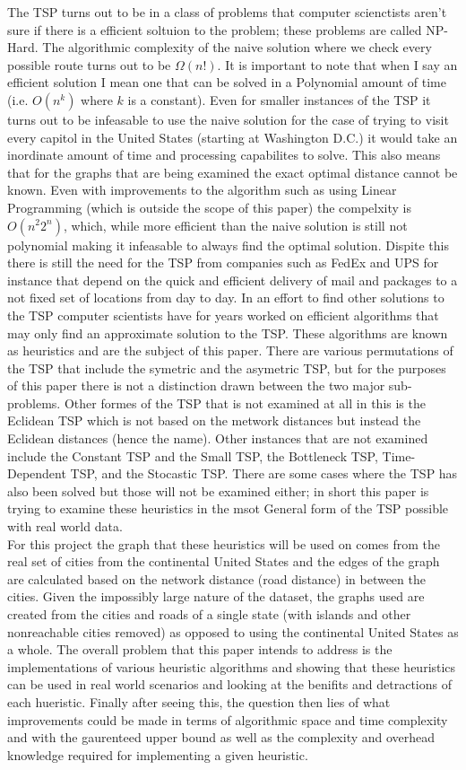 \documentclass[midd]{thesis}
\newcommand{\tab}{\hspace*{2em}}
\begin{document}
\tab The TSP turns out to be in a class of problems that computer scienctists aren't sure if there is a efficient soltuion to the problem; these problems are called NP-Hard. The algorithmic complexity of the naive solution where we check every possible route turns out to be $\Omega(n!)$. It is important to note that when I say an efficient solution I mean one that can be solved in a Polynomial amount of time (i.e. $O(n^k)$ where $k$ is a constant). Even for smaller instances of the TSP it turns out to be infeasable to use the naive solution for the case of trying to visit every capitol in the United States (starting at Washington D.C.) it would take an inordinate amount of time and processing capabilites to solve. This also means that for the graphs that are being examined the exact optimal distance cannot be known. Even with improvements to the algorithm such as using Linear Programming (which is outside the scope of this paper) the compelxity is $O(n^{2}2^{n})$, which, while more efficient than the naive solution is still not polynomial making it  infeasable to always find the optimal solution. Dispite this there is still the need for the TSP from companies such as FedEx and UPS for instance that depend on the quick and efficient delivery of mail and packages to a not fixed set of locations from day to day. In an effort to find other solutions to the TSP computer scientists have for years worked on efficient algorithms that may only find an approximate solution to the TSP. These algorithms are known as heuristics and are the subject of this paper. There are various permutations of the TSP that include the symetric and the asymetric TSP, but for the purposes of this paper there is not a distinction drawn between the two major sub-problems. Other formes of the TSP that is not examined at all in this is the Eclidean TSP which is not based on the metwork distances but instead the Eclidean distances (hence the name). Other instances that are not examined include the Constant TSP and the Small TSP, the Bottleneck TSP, Time-Dependent TSP, and the Stocastic TSP. There are some cases where the TSP has also been solved but those will not be examined either; in short this paper is trying to examine these heuristics in the msot General form of the TSP possible with real world data.\\
\tab For this project the graph that these heuristics will be used on comes from the real set of cities from the continental United States and the edges of the graph are calculated based on the network distance (road distance) in between the cities. Given the impossibly large nature of the dataset, the graphs used are created from the cities and roads of a single state (with islands and other nonreachable cities removed) as opposed to using the continental United States as a whole. The overall problem that this paper intends to address is the implementations of various heuristic algorithms and showing that these heuristics can be used in real world scenarios and looking at the benifits and detractions of each hueristic. Finally after seeing this, the question then lies of what improvements could be made in terms of algorithmic space and time complexity and with the gaurenteed upper bound as well as the complexity and overhead knowledge required for implementing a given heuristic.\\
\end{document}
